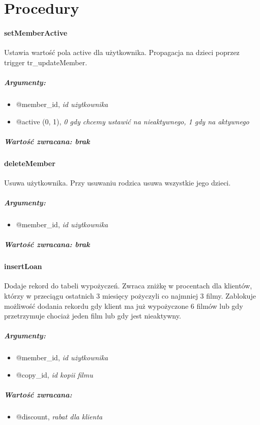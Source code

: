 \documentclass[12pt,a4paper,titlepage]{article}
\begin{document}

\newpage

\section{Procedury}
\paragraph{setMemberActive}
Ustawia wartość pola active dla użytkownika. Propagacja na dzieci poprzez trigger tr\_updateMember.
\subparagraph{Argumenty:}
\begin{itemize}
	\item @member\_id, \textit{id użytkownika}
	\item @active (0, 1), \textit{0 gdy chcemy ustawić na nieaktywnego, 1 gdy na aktywnego}
\end{itemize}
\subparagraph{Wartość zwracana: brak}

\paragraph{deleteMember}
Usuwa użytkownika. Przy usuwaniu rodzica usuwa wszystkie jego dzieci.
\subparagraph{Argumenty:}
\begin{itemize}
	\item @member\_id, \textit{id użytkownika}
\end{itemize}
\subparagraph{Wartość zwracana: brak}

\paragraph{insertLoan}
Dodaje rekord do tabeli wypożyczeń. Zwraca zniżkę w procentach dla klientów, którzy w przeciągu ostatnich 3 miesięcy pożyczyli co najmniej 3 filmy.
Zablokuje możliwość dodania rekordu gdy klient ma już wypożyczone 6 filmów lub gdy przetrzymuje chociaż jeden film lub gdy jest nieaktywny.
\subparagraph{Argumenty:}
\begin{itemize}
	\item @member\_id, \textit{id użytkownika}
	\item @copy\_id, \textit{id kopii filmu}
\end{itemize}
\subparagraph{Wartość zwracana:}
\begin{itemize}
	\item @discount, \textit{rabat dla klienta}
\end{itemize}
\end{document}
